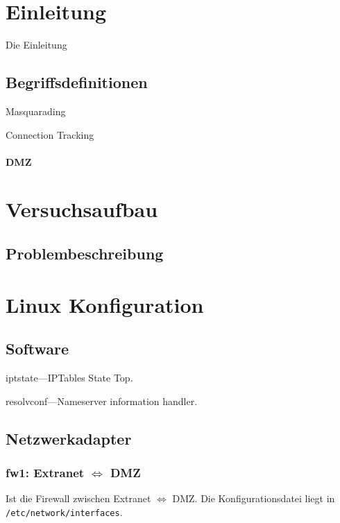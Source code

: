 \section{Einleitung}

Die Einleitung \cite{iptables}

\subsection{Begriffsdefinitionen}

Masquarading

Connection Tracking

\paragraph{DMZ}



\section{Versuchsaufbau}

\subsection{Problembeschreibung}



\section{Linux Konfiguration}

\subsection{Software}

iptstate---IPTables State Top.

resolvconf---Nameserver information handler.

\subsection{Netzwerkadapter}

\subsubsection{fw1: Extranet $\Longleftrightarrow$ DMZ}

Ist die Firewall zwischen Extranet $\Longleftrightarrow$ DMZ.
Die Konfigurationsdatei liegt in {\tt /etc/network/interfaces}.

